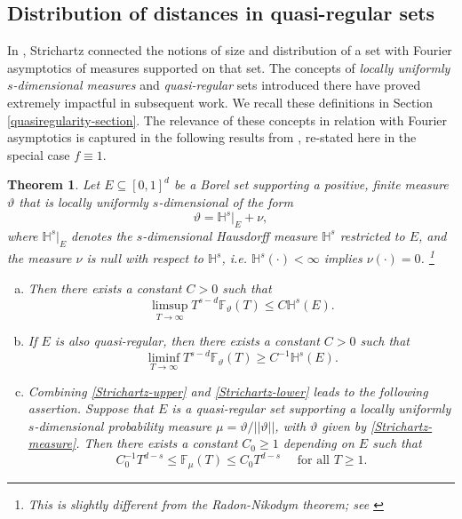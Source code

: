 \documentclass[a4paper,11pt]{amsart}
\newtheorem{theorem}{Theorem}
\numberwithin{equation}{section}
\begin{document}
\subsection{Distribution of distances in quasi-regular sets} \label{quasiregular-section}
In \cite{Strichartz-Asymptotics}, Strichartz connected the notions of size and distribution of a set with Fourier asymptotics of measures supported on that set. The concepts of {\em{locally uniformly $s$-dimensional measures}} and {\em{quasi-regular}} sets introduced there have proved extremely impactful in subsequent work. We recall these definitions in Section \ref{quasiregularity-section}. The relevance of these concepts in relation with Fourier asymptotics is captured in the following results from \cite{Strichartz-Asymptotics}, re-stated here in the special case $f \equiv 1$. 
\begin{theorem}\cite[Theorems 5.3 and 5.5]{Strichartz-Asymptotics} \label{Strichartz-theorem}
Let $E \subseteq [0,1]^d$ be a Borel set supporting a positive, finite measure $\vartheta$ that is locally uniformly $s$-dimensional of the form 
\begin{equation} \vartheta = \mathbb H^{s} \bigl|_E + \nu, \label{Strichartz-measure} \end{equation}  where $\mathbb H^{s}|_E$ denotes the $s$-dimensional Hausdorff measure $\mathbb H^s$ restricted to $E$, and  the measure $\nu$ is null with respect to $\mathbb H^{s}$, i.e. $\mathbb H^s(\cdot) < \infty$ implies $\nu(\cdot) = 0$. \footnote{This is slightly different from the Radon-Nikodym theorem; see \cite[Theorem 3.1]{Strichartz-Asymptotics}}
\begin{enumerate}[(a)]
\item Then there exists a constant $C > 0$ such that
\begin{equation} \label{Strichartz-upper} \limsup_{T \rightarrow \infty} T^{s-d} \mathbb F_{\vartheta}(T) \leq C \mathbb H^s(E). \end{equation} 
\vskip0.1in 
\item  If $E$ is also quasi-regular, then there exists a constant $C > 0$ such that 
\begin{equation}  \liminf_{T \rightarrow \infty} T^{s-d} \mathbb F_{\vartheta}(T) \geq C^{-1}\mathbb H^s(E). \label{Strichartz-lower}  \end{equation} 
\vskip0.1in
\item Combining \eqref{Strichartz-upper} and \eqref{Strichartz-lower} leads to the following assertion. Suppose that $E$ is a quasi-regular set supporting a locally uniformly $s$-dimensional probability measure $\mu = \vartheta/||\vartheta||$, with $\vartheta$ given by \eqref{Strichartz-measure}. Then there exists a constant $C_0 \geq 1$ depending on $E$ such that  
\begin{equation} 
C_0^{-1} T^{d-s}\leq \mathbb F_{\mu}(T) \leq C_0 T^{d-s}\quad \text{ for all $T \geq 1$.} \label{Strichartz-upper-lower} 
\end{equation} 
\end{enumerate}
\end{theorem}
\end{document}
